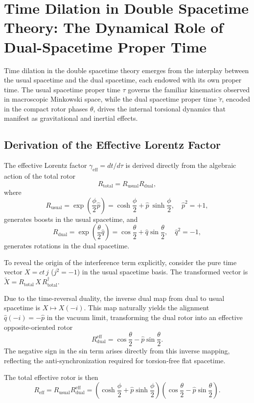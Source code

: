 \documentclass[dvipdfmx,a4paper]{article}
\begin{document}
\section{Time Dilation in Double Spacetime Theory: The Dynamical Role of Dual-Spacetime Proper Time}
\label{sec:timedilation}

Time dilation in the double spacetime theory emerges from the interplay between the usual spacetime and the dual spacetime, each endowed with its own proper time. The usual spacetime proper time $\tau$ governs the familiar kinematics observed in macroscopic Minkowski space, while the dual spacetime proper time $\tilde{\tau}$, encoded in the compact rotor phases $\theta$, drives the internal torsional dynamics that manifest as gravitational and inertial effects.

\subsection{Derivation of the Effective Lorentz Factor}

The effective Lorentz factor $\gamma_\text{eff} = dt/d\tau$ is derived directly from the algebraic action of the total rotor
\[
R_\text{total} = R_\text{usual} R_\text{dual},
\]
where
\[
R_\text{usual} = \exp\!\left(\frac{\phi}{2} \hat{p}\right) = \cosh\frac{\phi}{2} + \hat{p}\: \sinh\frac{\phi}{2}, \quad \hat{p}^2 = +1,
\]
generates boosts in the usual spacetime, and
\[
R_\text{dual} = \exp\!\left(\frac{\theta}{2} \hat{q}\right) = \cos\frac{\theta}{2} + \hat{q} \sin\frac{\theta}{2}, \quad \hat{q}^2 = -1,
\]
generates rotations in the dual spacetime.

To reveal the origin of the interference term explicitly, consider the pure time vector $X = ct \, j$ ($j^2 = -1$) in the usual spacetime basis. The transformed vector is $\tilde{X} = R_\text{total} \, X \, R_\text{total}^\dagger$.

Due to the time-reversal duality, the inverse dual map from dual to usual spacetime is $X \mapsto X(-i)$. This map naturally yields the alignment $\hat{q} (-i) = -\hat{p}$ in the vacuum limit, transforming the dual rotor into an effective opposite-oriented rotor
\[
R_\text{dual}^\text{eff} = \cos\frac{\theta}{2} - \hat{p} \sin\frac{\theta}{2}.
\]
The negative sign in the sin term arises directly from this inverse mapping, reflecting the anti-synchronization required for torsion-free flat spacetime.

The total effective rotor is then
\[
R_\text{eff} = R_\text{usual} R_\text{dual}^\text{eff} = \left( \cosh\frac{\phi}{2} + \hat{p} \sinh\frac{\phi}{2} \right) \left( \cos\frac{\theta}{2} - \hat{p} \sin\frac{\theta}{2} \right).
\]
\end{document}
